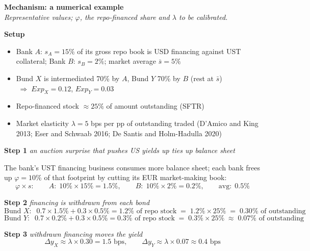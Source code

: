 \documentclass[english, 11pt, oneside]{article}
\newcommand{\beqno}{\begin{equation*}}
\newcommand{\eeqno}{\end{equation*}}
\newcommand{\bit}{\begin{itemize}}
\newcommand{\eit}{\end{itemize}}
\begin{document}
\setlength{\parindent}{0cm}

{\large \textbf{Mechanism: a numerical example}}\\[4pt]
\textit{Representative values; $\varphi$, the repo-financed share and $\lambda$ to be calibrated.}

\vspace{0.8em}

\textbf{Setup}
\bit
\item Bank $A$: $s_A = 15\%$ of its gross repo book is USD financing against UST collateral; Bank $B$: $s_B = 2\%$; market average $\bar{s} = 5\%$
\item Bund $X$ is intermediated 70\% by $A$, Bund $Y$ 70\% by $B$ (rest at $\bar{s}$) $\;\Rightarrow\; \mathit{Exp}_X = 0.12$, $\mathit{Exp}_Y = 0.03$
\item Repo-financed stock $\approx 25\%$ of amount outstanding (SFTR)
\item Market elasticity $\lambda = 5$ bps per pp of outstanding traded (D'Amico and King 2013; Eser and Schwaab 2016; De Santis and Holm-Hadulla 2020)
\eit

\vspace{0.4em}

\textbf{Step 1} \quad \textit{an auction surprise that pushes US yields up ties up balance sheet}

The bank's UST financing business consumes more balance sheet; each bank frees up $\varphi = 10\%$ of that footprint by cutting its EUR market-making book:
\beqno
\varphi \times s: \qquad A\!: \; 10\% \times 15\% = 1.5\%, \qquad B\!: \; 10\% \times 2\% = 0.2\%, \qquad \text{avg}\!: \; 0.5\%
\eeqno

\textbf{Step 2} \quad \textit{financing is withdrawn from each bond}
\beqno
\text{Bund } X\!: \;\; 0.7 \times 1.5\% + 0.3 \times 0.5\% = 1.2\% \text{ of repo stock} \;=\; 1.2\% \times 25\% \;=\; 0.30\% \text{ of outstanding}
\eeqno
\beqno
\text{Bund } Y\!: \;\; 0.7 \times 0.2\% + 0.3 \times 0.5\% = 0.3\% \text{ of repo stock} \;=\; 0.3\% \times 25\% \;\approx\; 0.07\% \text{ of outstanding}
\eeqno

\textbf{Step 3} \quad \textit{withdrawn financing moves the yield}
\beqno
\Delta y_X \approx \lambda \times 0.30 = 1.5 \text{ bps}, \qquad
\Delta y_Y \approx \lambda \times 0.07 \approx 0.4 \text{ bps}
\eeqno

\vspace{0.4em}
\end{document}
